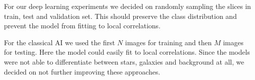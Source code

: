 For our deep learning experiments we decided on randomly sampling the slices in train, test and validation set. This should preserve the class distribution and prevent the model from fitting to local correlations.

For the classical AI we used the first $N$ images for training and then $M$ images for testing. Here the model could easily fit to local correlations. Since the models were not able to differentiate between stars, galaxies and background at all, we decided on not further improving these approaches.
